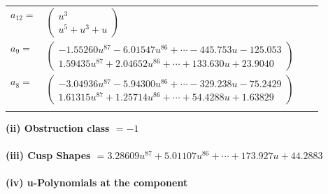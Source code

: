 \documentclass[1p]{elsarticle_modified}
\theoremstyle{definition}
\begin{document}
\begin{tabular}{m{7pt} m{180pt} m{7pt} m{180pt} }
\flushright $a_{12}=$&$\begin{pmatrix}u^3\\u^5+u^3+u\end{pmatrix}$ \\
\flushright $a_{9}=$&$\begin{pmatrix}-1.55260 u^{87}-6.01547 u^{86}+\cdots-445.753 u-125.053\\1.59435 u^{87}+2.04652 u^{86}+\cdots+133.630 u+23.9040\end{pmatrix}$ \\
\flushright $a_{8}=$&$\begin{pmatrix}-3.04936 u^{87}-5.94300 u^{86}+\cdots-329.238 u-75.2429\\1.61315 u^{87}+1.25714 u^{86}+\cdots+54.4288 u+1.63829\end{pmatrix}$\\&\end{tabular}
\flushleft \textbf{(ii) Obstruction class $= -1$}\\~\\
\flushleft \textbf{(iii) Cusp Shapes $= 3.28609 u^{87}+5.01107 u^{86}+\cdots+173.927 u+44.2883$}\\~\\
\newpage\renewcommand{\arraystretch}{1}
\flushleft \textbf{(iv) u-Polynomials at the component}\newline \\
\end{document}
